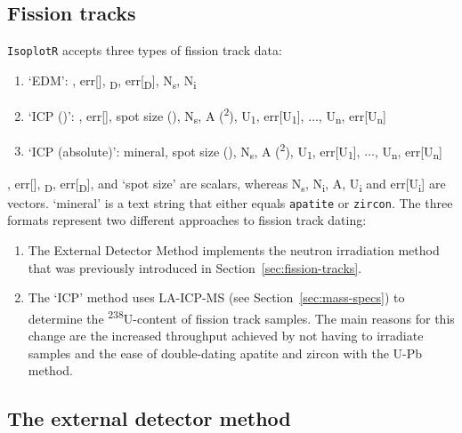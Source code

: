 \begin{refsection}

\chapter{Fission tracks}\label{ch:fissiontracks}

\texttt{IsoplotR} accepts three types of fission track data:

\begin{enumerate}
\item{`EDM':} \textzeta, err[\textzeta],
  \textrho\textsubscript{D}, err[\textrho\textsubscript{D}], 
  N\textsubscript{s}, N\textsubscript{i}
\item{`ICP (\textzeta)':} \textzeta, err[\textzeta], spot size
  (), N\textsubscript{s}, A (\textsuperscript{2}),
  U\textsubscript{1}, err[U\textsubscript{1}], $\ldots$, U\textsubscript{n},
  err[U\textsubscript{n}]
\item{`ICP (absolute)':} mineral, spot size (),
  N\textsubscript{s}, A (\textsuperscript{2}),
  U\textsubscript{1}, err[U\textsubscript{1}], $\ldots$, U\textsubscript{n},
  err[U\textsubscript{n}]
\end{enumerate}

\noindent \textzeta, err[\textzeta], \textrho\textsubscript{D},
err[\textrho\textsubscript{D}], and `spot size' are scalars, whereas
N\textsubscript{s}, N\textsubscript{i}, A, U\textsubscript{i} and
err[U\textsubscript{i}] are vectors. `mineral' is a text string that
either equals \texttt{apatite} or \texttt{zircon}.  The three formats
represent two different approaches to fission track dating:

\begin{enumerate}
\item The External Detector Method \citep[EDM,][]{hurford1983}
  implements the neutron irradiation method that was previously
  introduced in Section~\ref{sec:fission-tracks}.
\item The `ICP' method uses LA-ICP-MS (see
  Section~\ref{sec:mass-specs}) to determine the
  \textsuperscript{238}U-content of fission track samples.  The main
  reasons for this change are the increased throughput achieved by not
  having to irradiate samples and the ease of double-dating apatite
  and zircon with the U-Pb method.
\end{enumerate}

\section{The external detector method}
\label{sec:EDM}


\end{refsection}
